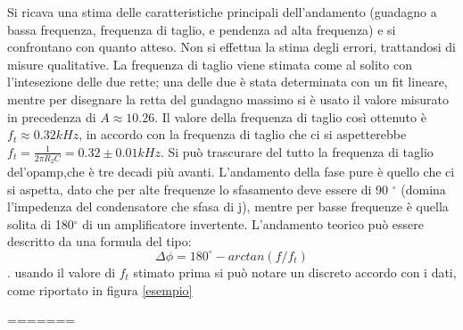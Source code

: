 \documentclass[10pt,a4paper]{article}
\begin{document}
	
	Si ricava una stima delle caratteristiche principali dell'andamento (guadagno a bassa frequenza, frequenza di taglio, e pendenza ad alta frequenza)
	e si confrontano con quanto atteso. Non si effettua la stima degli errori, trattandosi di misure qualitative.
	La frequenza di taglio viene stimata come al solito con l'intesezione delle due rette; una delle due è stata determinata con un fit lineare, mentre per disegnare la retta del guadagno massimo si è usato il valore misurato in precedenza di $A\approx10.26$. Il valore della frequenza di taglio così ottenuto è $f_t\approx0.32 kHz$, in accordo con la frequenza di taglio che ci si aspetterebbe $f_t=\frac{1}{2\pi R_2C}=0.32\pm0.01 kHz$. Si può trascurare del tutto la frequenza di taglio del'opamp,che è tre decadi più avanti.
	L'andamento della fase pure è quello che ci si aspetta, dato che per alte frequenze lo sfasamento deve essere di 90 $^{\circ}$ (domina l'impedenza del condensatore che sfasa di j), mentre per basse frequenze è quella solita di 180$^{\circ}$ di un amplificatore invertente. L'andamento teorico può essere descritto da una formula del tipo:\[\Delta\phi=180^{\circ}-arctan(f/f_t)\]. usando il valore di $f_t$ stimato prima si può notare un discreto accordo con i dati, come riportato in figura \ref{esempio}
	
=======
	
\end{document}
